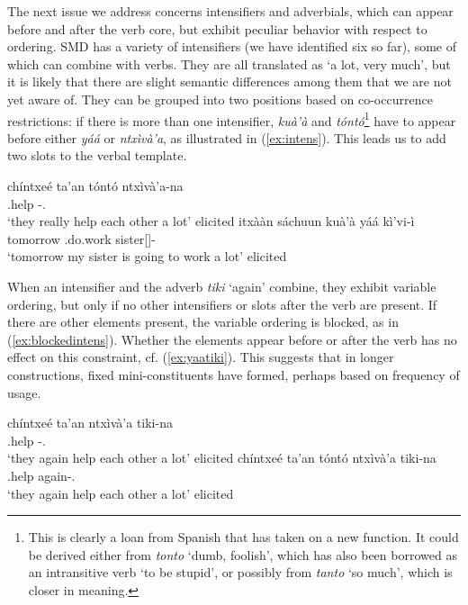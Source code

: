 \documentclass[output=paper]{langscibook}
\begin{document}
The next issue we address concerns intensifiers and adverbials, which can appear before and after the verb core, but exhibit peculiar behavior with respect to ordering. 
SMD has a variety of intensifiers (we have identified six so far), some of which can combine with verbs. They are all translated as `a lot, very much', but it is likely that there are slight semantic differences among them that we are not yet aware of. 
They can be grouped into two positions based on co-occurrence restrictions: if there is more than one intensifier, \textit{kuà'à} and \textit{tóntó}\footnote{This is clearly a loan from Spanish that has taken on a new function. It could be derived either from \textit{tonto} `dumb, foolish', which has also been borrowed as an intransitive verb `to be stupid', or possibly from \textit{tanto} `so much', which is closer in meaning.} have to appear before either \textit{yáá} or \textit{ntxìvà'a}, as illustrated in (\ref{ex:intens}).
This leads us to add two slots to the verbal template.

\ea \label{ex:intens}
 \ea 
    \gll chíntxeé ta’an tóntó ntxìvà’a-na	\\
		\Incmpl.help \Recp{} \Intens{} \Intens-\Tpl.\Hum{}		\\
	\glt `they really help each other a lot' \hfill elicited
    \ex 
    \gll itxààn sáchuun kuà’à yáá kì'vi-ì \\
		  tomorrow \Pot.do.work \Intens{} \Intens{} sister[\F{}]-\Fsg{} \\
	\glt `tomorrow my sister is going to work a lot' \hfill elicited
 \z
\z

When an intensifier and the adverb \textit{tiki} `again' combine, they exhibit variable ordering, but only if no other intensifiers or slots after the verb are present. 
If there are other elements present, the variable ordering is blocked, as in (\ref{ex:blockedintens}). Whether the elements appear before or after the verb has no effect on this constraint, cf. (\ref{ex:yaatiki}).
This suggests that in longer constructions, fixed mini-constituents have formed, perhaps based on frequency of usage. 

\ea \label{ex:blockedintens}
    \ea
    \gll chíntxeé ta’an ntxìvà’a tiki-na	\\
		\Incmpl.help \Recp{} \Intens{} \Intens-\Tpl.\Hum{}		\\
	\glt `they again help each other a lot' \hfill elicited
    \ex 
    \gll chíntxeé ta’an tóntó ntxìvà’a tiki-na	\\
		\Incmpl.help \Recp{} \Intens{} \Intens{} again-\Tpl.\Hum{}		\\
	\glt `they again help each other a lot' \hfill elicited
 \z
\z
\end{document}

